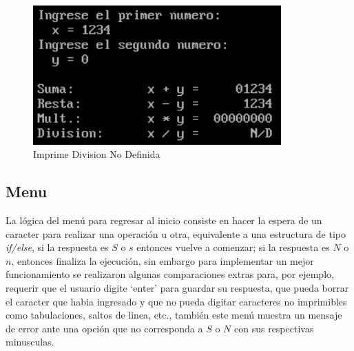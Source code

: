 \documentclass[letter,12 pt,titlepage]{article}
\begin{document}
    \begin{figure}[H]
    \centering
    \includegraphics[width=0.85\textwidth]{img/07.png}
    \caption{Imprime Division No Definida}
    \end{figure}

    \subsection{Menu}

    La lógica del menú para regresar al inicio consiste en hacer la espera de un caracter para realizar una operación u otra, equivalente a una estructura de tipo \textit{if/else}, si la respuesta es $S$ o $s$ entonces vuelve a comenzar; si la respuesta es $N$ o $n$, entonces finaliza la ejecución, sin embargo para implementar un mejor funcionamiento se realizaron algunas comparaciones extras para, por ejemplo, requerir que el usuario digite `enter' para guardar su respuesta, que pueda borrar el caracter que habia ingresado y que no pueda digitar caracteres no imprimibles como tabulaciones, saltos de linea, etc., también este menú muestra un mensaje de error ante una opción que no corresponda a $S$ o $N$ con sus respectivas minusculas.
\end{document}
